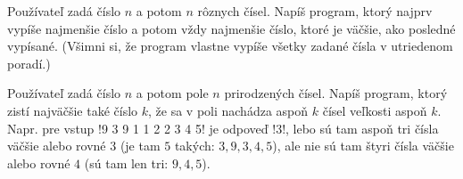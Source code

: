 \begin{uloha}
  \label{uloha:sort1}
  Používateľ zadá číslo $n$ a potom $n$ rôznych čísel. Napíš program, ktorý
  najprv vypíše najmenšie číslo a potom vždy najmenšie číslo, ktoré
  je väčšie, ako posledné vypísané. (Všimni si, že program vlastne
  vypíše všetky zadané čísla v utriedenom poradí.)
\end{uloha}

\begin{uloha}
  Používateľ zadá číslo $n$ a potom pole $n$ prirodzených čísel. Napíš program,
  ktorý zistí najväčšie také číslo $k$, že sa v poli nachádza aspoň $k$
  čísel veľkosti aspoň $k$. Napr. pre vstup \prg!9 3 9 1 1 2 2 3 4 5! 
  je odpoveď \prg!3!, lebo
  sú tam aspoň tri čísla väčšie alebo rovné $3$ (je tam $5$ takých: $3, 9, 3, 4, 5$),
  ale nie sú tam štyri čísla väčšie alebo rovné $4$ (sú tam len tri: $9, 4, 5$).
\end{uloha}


